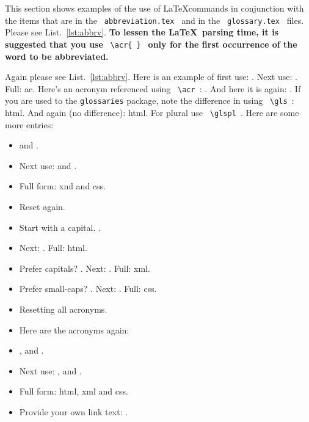 This section shows examples of the use of \LaTeX commands in conjunction with the items that are in the \verb| abbreviation.tex | and in the \verb| glossary.tex | files.  Please see List.~\ref{lst:abbrv}. \textbf{To lessen the \LaTeX \ parsing time, it is suggested that you use} \verb| \acr{ } | \textbf{only for the first occurrence of the word to be abbreviated.}

Again please see List.~\ref{lst:abbrv}. Here is an example of first use: . Next use: . Full: \gls{ac}.  Here's an acronym referenced using \verb| \acr |: .  And here it is again: . If you are used to the \texttt{glossaries} package, note the difference in using \verb| \gls |: \gls{html}. And again (no difference): \gls{html}. For plural use  \verb| \glspl |.  Here are some more entries:

\begin{itemize}

	\item {} and .

	\item Next use:  and .

	\item Full form: \gls{xml} and \gls{css}.

	\item Reset again. 

	\item Start with a capital. .

	\item Next: . Full: \Gls{html}.

	\item Prefer capitals? \renewcommand{\acronymfont}[1]{\MakeTextUppercase{#1}} . Next: . Full: \gls{xml}.

	\item Prefer small-caps? \renewcommand{\acronymfont}[1]{\textsc{#1}} . Next: . Full: \gls{css}.

	\item Resetting all acronyms.

	\item Here are the acronyms again:

	\item {},  and .

	\item Next use: ,  and .

	\item Full form: \Gls{html}, \gls{xml} and \gls{css}.

	\item Provide your own link text: .

\end{itemize}



